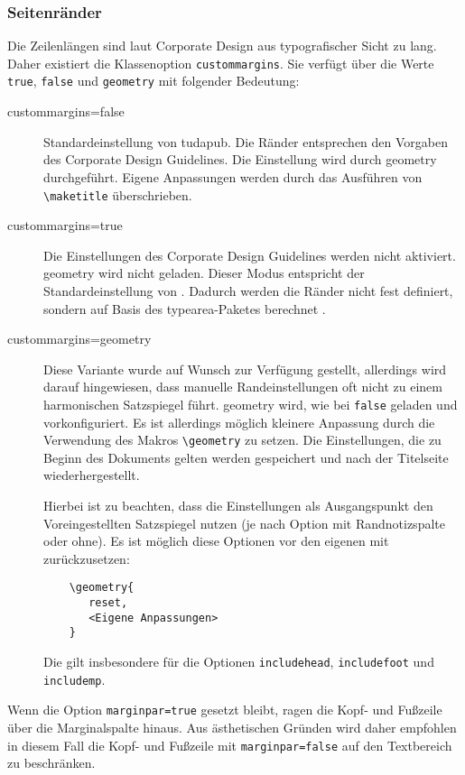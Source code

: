 \documentclass[
	german,
	accentcolor=9c,%
	]{tudapub}
\let\code\texttt
\let\pck\textsf
\let\cls\textsf
\begin{document}
\subsubsection{Seitenränder}
Die Zeilenlängen sind laut Corporate Design aus typografischer Sicht zu lang.
Daher existiert die Klassenoption \code{custommargins}. Sie verfügt über die Werte \code{true}, \code{false} und \code{geometry} mit folgender Bedeutung:

\begin{description}
\item[custommargins=false] Standardeinstellung von \cls{tudapub}. Die Ränder entsprechen den Vorgaben des Corporate Design Guidelines. Die Einstellung wird durch \pck{geometry} durchgeführt. Eigene Anpassungen werden durch das Ausführen von \code{\textbackslash{}maketitle} überschrieben.
\item[custommargins=true] Die Einstellungen des Corporate Design Guidelines werden nicht aktiviert. \pck{geometry} wird nicht geladen. Dieser Modus entspricht der Standardeinstellung von \KOMAScript{}. Dadurch werden die Ränder nicht fest definiert, sondern auf Basis des \pck{typearea}-Paketes berechnet \cite[vgl.][]{scrguide}.
\item[custommargins=geometry]  Diese Variante wurde auf Wunsch zur Verfügung gestellt, allerdings wird darauf hingewiesen, dass manuelle Randeinstellungen oft nicht zu einem harmonischen Satzspiegel führt.
\pck{geometry} wird, wie bei \code{false} geladen und vorkonfiguriert. Es ist allerdings möglich kleinere Anpassung durch die Verwendung des Makros \code{\textbackslash{}geometry} zu setzen. Die Einstellungen, die zu Beginn des Dokuments gelten werden gespeichert und nach der Titelseite wiederhergestellt.

Hierbei ist zu beachten, dass die Einstellungen als Ausgangspunkt den Voreingestellten Satzspiegel nutzen (je nach Option mit Randnotizspalte oder ohne). Es ist möglich diese Optionen vor den eigenen mit zurückzusetzen:
\begin{verbatim}
	\geometry{
	   reset,
	   <Eigene Anpassungen>
	}
\end{verbatim}
Die gilt insbesondere für die Optionen \code{includehead}, \code{includefoot} und \code{includemp}.
\end{description}

Wenn die Option \code{marginpar=true} gesetzt bleibt, ragen die Kopf- und Fußzeile über die Marginalspalte hinaus. Aus ästhetischen Gründen wird daher empfohlen in diesem Fall die Kopf- und Fußzeile  mit \code{marginpar=false}  auf den Textbereich zu beschränken.
\end{document}
